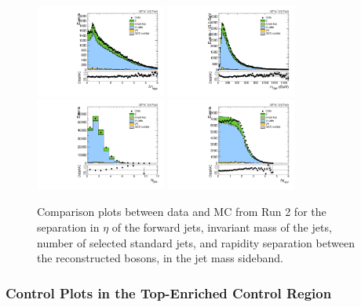\begin{figure}[htbp]
  \centering
  \includegraphics[width=0.3825\textwidth]{fig/controlPlots/SB_b1_allL_allP_allC_allD_Run2_lnujj_vbfDEta.pdf}
  \includegraphics[width=0.3825\textwidth]{fig/controlPlots/SB_b1_allL_allP_allC_allD_Run2_lnujj_vbfMass.pdf}\\
  \includegraphics[width=0.3825\textwidth]{fig/controlPlots/SB_b1_allL_allP_allC_allD_Run2_lnujj_nJets.pdf}
  \includegraphics[width=0.3825\textwidth]{fig/controlPlots/SB_b1_allL_allP_allC_allD_Run2_dy.pdf}\\
  \caption{
    Comparison plots between data and MC from Run 2 for the separation in $\eta$ of the \VBF forward jets, invariant mass of the \VBF jets, number of selected standard jets, and rapidity separation between the reconstructed bosons, in the jet mass sideband.
  }
  \label{fig:SB_controlPlotsRun2_4}
\end{figure}

\subsubsection{Control Plots in the Top-Enriched Control Region}

